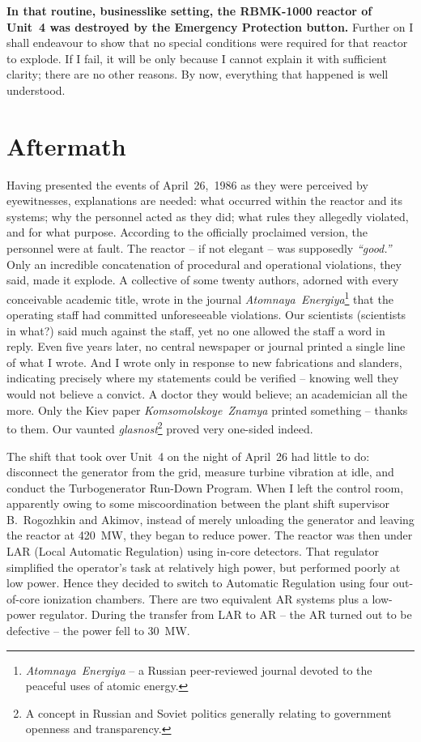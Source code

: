 \documentclass[openright]{bookest}
\begin{document}
\textbf{In that routine, businesslike setting, the RBMK-1000 reactor of Unit~4 was destroyed by the Emergency Protection button.} Further on I shall endeavour to show that no special conditions were required for that reactor to explode. If I fail, it will be only because I cannot explain it with sufficient clarity; there are no other reasons. By now, everything that happened is well understood.

\section{Aftermath}

Having presented the events of April~26,~1986 as they were perceived by eyewitnesses, explanations are needed: what occurred within the reactor and its systems; why the personnel acted as they did; what rules they allegedly violated, and for what purpose. According to the officially proclaimed version, the personnel were at fault. The reactor -- if not elegant -- was supposedly \textit{``good.''} Only an incredible concatenation of procedural and operational violations, they said, made it explode. A collective of some twenty authors, adorned with every conceivable academic title, wrote in the journal \textit{Atomnaya~Energiya}\footnote{\textit{Atomnaya~Energiya} -- a Russian peer-reviewed journal devoted to the peaceful uses of atomic energy.} that the operating staff had committed unforeseeable violations. Our scientists (scientists in what?) said much against the staff, yet no one allowed the staff a word in reply. Even five years later, no central newspaper or journal printed a single line of what I wrote. And I wrote only in response to new fabrications and slanders, indicating precisely where my statements could be verified -- knowing well they would not believe a convict. A doctor they would believe; an academician all the more. Only the Kiev paper \textit{Komsomolskoye~Znamya} printed something -- thanks to them. Our vaunted \textit{glasnost}\footnote{A concept in Russian and Soviet politics generally relating to government openness and transparency.} proved very one-sided indeed.

The shift that took over Unit~4 on the night of April~26 had little to do: disconnect the generator from the grid, measure turbine vibration at idle, and conduct the Turbogenerator Run-Down Program. When I left the control room, apparently owing to some miscoordination between the plant shift supervisor B.~Rogozhkin and Akimov, instead of merely unloading the generator and leaving the reactor at \qty{420}{\mega\watt}, they began to reduce power. The reactor was then under LAR (Local Automatic Regulation) using in-core detectors. That regulator simplified the operator's task at relatively high power, but performed poorly at low power. Hence they decided to switch to Automatic Regulation using four out-of-core ionization chambers. There are two equivalent AR systems plus a low-power regulator. During the transfer from LAR to AR -- the AR turned out to be defective -- the power fell to \qty{30}{\mega\watt}.
\end{document}

